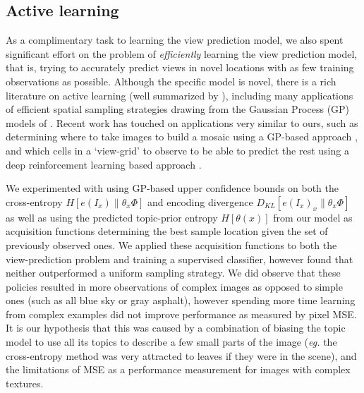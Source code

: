 \subsection{Active learning}\label{sec:active-learning}
As a complimentary task to learning the view prediction model, we also spent significant effort on the problem of \emph{efficiently} learning the view prediction model, that is, trying to accurately predict views in novel locations with as few training observations as possible. Although the specific model is novel, there is a rich literature on active learning (well summarized by \citep{settles2012active}), including many applications of efficient spatial sampling strategies drawing from the Gaussian Process (GP) models of \citep{Seo2000,guestrin2005near}. Recent work has touched on applications very similar to ours, such as determining where to take images to build a mosaic using a GP-based approach \citep{sandeep_crv_2016}, and which cells in a `view-grid' to observe to be able to predict the rest using a deep reinforcement learning based approach \citep{Jayaraman2017}.

We experimented with using GP-based upper confidence bounds on both the cross-entropy $H\left[e(I_x) \| \theta_x\Phi \right]$ and encoding divergence $D_{KL}\left[e(I_x)_x \| \theta_x\Phi\right]$ as well as using the predicted topic-prior entropy $H\left[\theta(x)\right]$ from our model as acquisition functions determining the best sample location given the set of previously observed ones. We applied these acquisition functions to both the view-prediction problem and training a supervised classifier, however found that neither outperformed a uniform sampling strategy. We did observe that these policies resulted in more observations of complex images as opposed to simple ones (such as all blue sky or gray asphalt), however spending more time learning from complex examples did not improve performance as measured by pixel MSE. It is our hypothesis that this was caused by a combination of biasing the topic model to use all its topics to describe a few small parts of the image (\emph{eg.} the cross-entropy method was very attracted to leaves if they were in the scene), and the limitations of MSE as a performance measurement for images with complex textures.

